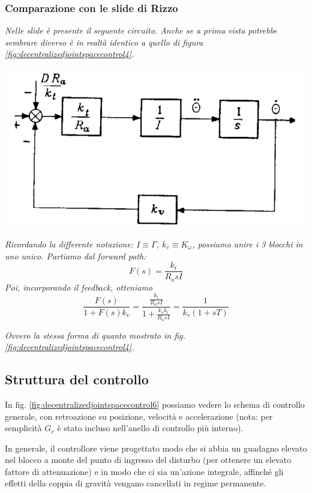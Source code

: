 \vspace*{20pt}
\begin{mdframed}[leftmargin=15pt, rightmargin=15pt, leftline=false, rightline=false]
\subsubsection{Comparazione con le slide di Rizzo}
\textit{Nelle slide è presente il seguente circuito. Anche se a prima vista potrebbe sembrare diverso è in realtà identico a quello di figura \ref{fig:decentralizedjointspacecontrol4}.}

{
	\centering
	\includegraphics[width=0.6\linewidth]{images/decentralized_joint_space_control_5}
	\label{fig:decentralizedjointspacecontrol5}
	\par
}

\textit{Ricordando la differente notazione: $I \equiv \Gamma$, $k_v \equiv K_\omega$, possiamo unire i 3 blocchi in uno unico. Partiamo dal forward path:}
$$
F(s) = \frac{k_t}{R_a sI}
$$
\textit{Poi, incorporando il feedback, otteniamo}
$$
\frac{F(s)}{1 + F(s)k_v} = 
\frac{ \frac{k_t}{R_a sI} }{1 +  \frac{k_v k_t}{R_a sI} } = \frac{1}{k_v(1 + sT)}
$$

\textit{Ovvero la stessa forma di quanto mostrato in fig. \ref{fig:decentralizedjointspacecontrol4}.}
\end{mdframed}




\vspace{25pt}
\subsection{Struttura del controllo}

In fig. \ref{fig:decentralizedjointspacecontrol6} possiamo vedere lo schema di controllo generale, con retroazione su posizione, velocità e accelerazione (nota: per semplicità $G_v$ è stato incluso nell'anello di controllo più interno).

In generale, il controllore viene progettato modo che si abbia un guadagno elevato nel blocco a monte del punto di ingresso del disturbo (per ottenere un elevato fattore di attenuazione) e in modo che ci sia un’azione integrale, affinché gli effetti della coppia di gravità vengano cancellati in regime permanente.

